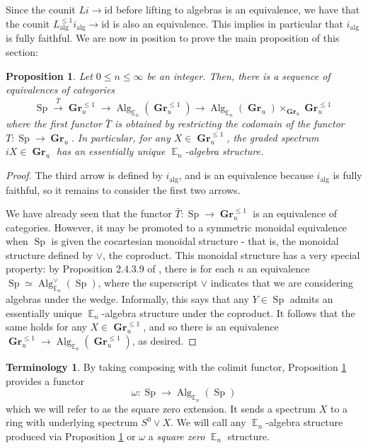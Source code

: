 \documentclass[reqno, oneside]{amsart}
\theoremstyle{definition}
\newtheorem{term}[nul]{Terminology}
\theoremstyle{plain}
\newtheorem{prop}[nul]{Proposition}
\DeclareMathOperator{\E}{\mathbb{E}}
\DeclareMathOperator{\Gr}{\textbf{Gr}}
\DeclareMathOperator{\Alg}{\text{Alg}}
\DeclareMathOperator{\Sp}{\text{Sp}}
\begin{document}
Since the counit $Li \to \text{id}$ before lifting to algebras is an equivalence, we have that the counit $L^{\leq 1}_{\text{alg}}  i_{\text{alg}} \to \text{id}$ is also an equivalence.  This implies in particular that $i_{\text{alg}}$ is fully faithful.  We are now in position to prove the main proposition of this section:

\begin{prop}\label{prop:sq0unique}
Let $0\leq n\leq \infty$ be an integer.  Then, there is a sequence of equivalences of categories $$\Sp \xrightarrow{\bar{T}} \Gr_u^{\leq 1} \longrightarrow \Alg_{\E_n}(\Gr_u^{\leq 1}) \longrightarrow  \Alg_{\E_n}( \Gr_u) \times_{\Gr_u} \Gr^{\leq 1}_u $$ where the first functor $\bar{T}$ is obtained by restricting the codomain of the functor $T:\Sp \to \Gr_u.$  In particular, for any $X\in \Gr_u^{\leq 1}$, the graded spectrum $iX\in \Gr_u$ has an essentially unique $\E_n$-algebra structure.  %
\end{prop}
\begin{proof}
The third arrow is defined by $i_{\text{alg}}$, and is an equivalence because $i_{\text{alg}}$ is fully faithful, so it remains to consider the first two arrows.  


We have already seen that the functor $\bar{T}: \Sp \to \Gr^{\leq 1}_u$ is an equivalence of categories.  However, it may be promoted to a symmetric monoidal equivalence when $\Sp$ is given the cocartesian monoidal structure - that is, the monoidal structure defined by $\vee$, the coproduct.  This monoidal structure has a very special property: by Proposition 2.4.3.9 of \cite{HA}, there is for each $n$ an equivalence $\Sp \simeq \Alg^{\vee}_{\E_n}(\Sp)$, where the superscript $\vee$ indicates that we are considering algebras under the wedge.  Informally, this says that any $Y\in \Sp$ admits an essentially unique $\E_n$-algebra structure under the coproduct.  It follows that the same holds for any $X\in \Gr^{\leq 1}_u$, and so there is an equivalence $\Gr^{\leq 1}_u \to \Alg_{\E_n}(\Gr^{\leq 1}_u)$, as desired.    
\end{proof}


\begin{term}
By taking composing with the colimit functor, Proposition \ref{prop:sq0unique} provides a functor $$\omega: \Sp \to \Alg_{\E_n}(\Sp)$$ which we will refer to as the square zero extension.  It sends a spectrum $X$ to a ring with underlying spectrum $S^0\vee X$.  We will call any $\E_n$-algebra structure produced via Proposition \ref{prop:sq0unique} or $\omega$ a \emph{square zero} $\E_n$ structure.  
\end{term}
\end{document}

